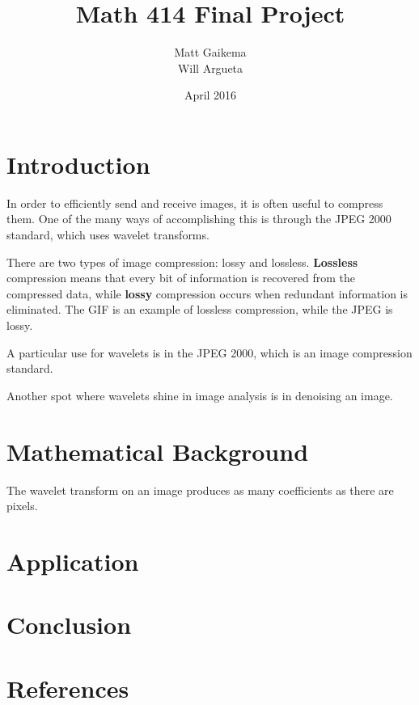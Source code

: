 \documentclass{article}
\title{Math 414 Final Project}
\author{Matt Gaikema \\ Will Argueta}
\date{April 2016}
\begin{document}
\maketitle

\section{Introduction}

In order to efficiently send and receive images, it is often useful to compress them.
One of the many ways of accomplishing this is through the JPEG 2000 standard, which uses wavelet transforms.

There are two types of image compression: lossy and lossless.
\textbf{Lossless} compression means that every bit of information is recovered from the compressed data,
while \textbf{lossy} compression occurs when redundant information is eliminated.
The GIF is an example of lossless compression, while the JPEG is lossy.

A particular use for wavelets is in the JPEG 2000, which is an image compression standard.

Another spot where wavelets shine in image analysis is in denoising an image.

\section{Mathematical Background}

The wavelet transform on an image produces as many coefficients as there are pixels.


\section{Application}


\section{Conclusion}


\section{References}
\end{document}
